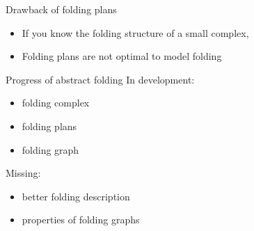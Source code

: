 \begin{frame}{Drawback of folding plans}
    \begin{itemize}
        \item<7->[$\Rightarrow$]If you know the folding structure of a small complex,
        \item<9->[$\leadsto$]Folding plans are not optimal to model folding
    \end{itemize}
\end{frame}


\begin{frame}{Progress of abstract folding}
    \pause
    In development:
    \begin{itemize}
        \pause
        \item folding complex
        \pause
        \item folding plans
        \pause
        \item folding graph
    \end{itemize}

    \pause
    Missing:
    \begin{itemize}
        \pause
        \item better folding description
        \pause
        \item properties of folding graphs
    \end{itemize}
\end{frame}


